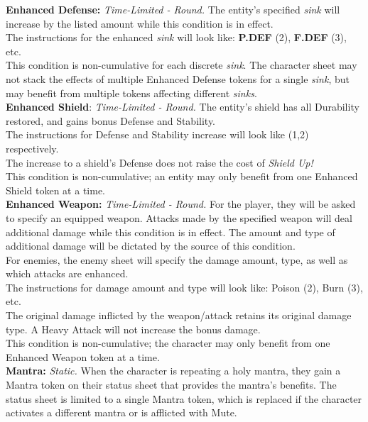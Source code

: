 \documentclass[12pt]{article}
\begin{document}
\begin{multicols*}{2}
\textbf{Enhanced Defense:} \emph{Time-Limited - Round.} The entity’s specified \emph{sink} will increase by the listed amount while this condition is in effect.\\
The instructions for the enhanced \emph{sink} will look like: \textbf{P.DEF} (2), \textbf{F.DEF} (3), etc.\\
This condition is non-cumulative for each discrete \emph{sink}. The character sheet may not stack the effects of multiple Enhanced Defense tokens for a single \emph{sink}, but may benefit from multiple tokens affecting different \emph{sinks}.\\

\textbf{Enhanced Shield}: \emph{Time-Limited - Round.} The entity’s shield has all Durability restored, and gains bonus Defense and Stability.\\
The instructions for Defense and Stability increase will look like (1,2) respectively.\\
The increase to a shield’s Defense does not raise the cost of \emph{Shield Up!}\\
This condition is non-cumulative; an entity may only benefit from one Enhanced Shield token at a time.\\

\textbf{Enhanced Weapon:} \emph{Time-Limited - Round.} For the player, they will be asked to specify an equipped weapon. Attacks made by the specified weapon will deal additional damage while this condition is in effect. The amount and type of additional damage will be dictated by the source of this condition.\\
For enemies, the enemy sheet will specify the damage amount, type, as well as which attacks are enhanced.\\
The instructions for damage amount and type will look like: Poison (2), Burn (3), etc.\\
The original damage inflicted by the weapon/attack retains its original damage type. A Heavy Attack will not increase the bonus damage.\\
This condition is non-cumulative; the character may only benefit from one Enhanced Weapon token at a time.\\

\textbf{Mantra:} \emph{Static.} When the character is repeating a holy mantra, they gain a Mantra token on their status sheet that provides the mantra’s benefits. The status sheet is limited to a single Mantra token, which is replaced if the character activates a different mantra or is afflicted with Mute.\\


\end{multicols*}
\end{document}
